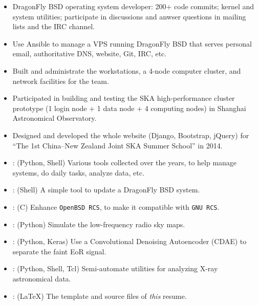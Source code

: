 \documentclass{resume}
\begin{document}
\begin{itemize}
  \item DragonFly BSD operating system developer:
    200+ code commits; kernel and system utilities;
    participate in discussions and anwser questions
    in mailing lists and the IRC channel.
  \item Use Ansible to manage a VPS running DragonFly BSD that serves
    personal email, authoritative DNS, website, Git, IRC, etc.
  \item Built and administrate the workstations, a 4-node computer cluster,
    and network facilities for the team.
  \item Participated in building and testing the SKA high-performance
    cluster prototype (1 login node + 1 data node + 4 computing nodes)
    in Shanghai Astronomical Observatory.
  \item Designed and developed the whole website (Django, Bootstrap, jQuery)
    for \enquote{The 1st China--New Zealand Joint SKA Summer School}
    in 2014.
\end{itemize}

\begin{itemize}
  \item {}:
    (Python, Shell)
    Various tools collected over the years, to help manage systems,
    do daily tasks, analyze data, etc.
  \item {}:
    (Shell)
    A simple tool to update a DragonFly BSD system.
  \item {}:
    (C)
    Enhance \texttt{OpenBSD RCS}, to make it compatible with \texttt{GNU RCS}.
  \item {}:
    (Python)
    Simulate the low-frequency radio sky maps.
  \item {}:
    (Python, Keras)
    Use a Convolutional Denoising Autoencoder (CDAE) to separate the
    faint EoR signal.
  \item {}:
    (Python, Shell, Tcl)
    Semi-automate utilities for analyzing X-ray astronomical data.
  \item {}:
    (\LaTeX)
    The template and source files of \emph{this} resume.
\end{itemize}
\end{document}
